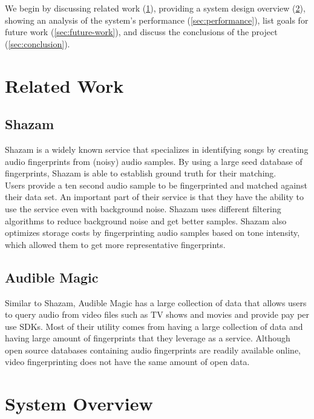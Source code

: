\documentclass[paper=a4, fontsize=11pt]{scrartcl} %
\numberwithin{equation}{section} %
\numberwithin{figure}{section} %
\numberwithin{table}{section} %
\begin{document}
We begin by discussing related work (\ref{sec:related-work}), providing a system design overview (\ref{sec:system-overview}), showing an analysis of the system's performance (\ref{sec:performance}), list goals for future work (\ref{sec:future-work}), and discuss the conclusions of the project (\ref{sec:conclusion}).

\section{Related Work}
\label{sec:related-work}

\subsection{Shazam}
\label{sec:shazam}

Shazam is a widely known service that specializes in identifying songs by creating audio fingerprints from (noisy) audio samples. By using a large seed database of fingerprints, Shazam is able to establish ground truth for their matching. \\

Users provide a ten second audio sample to be fingerprinted and matched against their data set. An important part of their service is that they have the ability to use the service even with background noise. Shazam uses different filtering algorithms to reduce background noise and get better samples. Shazam also optimizes storage costs by fingerprinting audio samples based on tone intensity, which allowed them to get more representative fingerprints. \\

\subsection{Audible Magic}
\label{sec:audible-magic}

Similar to Shazam, Audible Magic has a large collection of data that allows users to query audio from video files such as TV shows and movies and provide pay per use SDKs. Most of their utility comes from having a large collection of data and having large amount of fingerprints that they leverage as a service. Although open source databases containing audio fingerprints are readily available online, video fingerprinting does not have the same amount of open data. \\

\section{System Overview}
\label{sec:system-overview}
\end{document}
